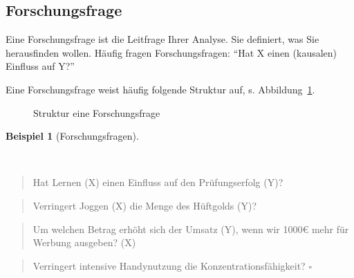 \documentclass[
  letterpaper,
  oneside,
  open=any]{scrbook}
\theoremstyle{definition}
\theoremstyle{definition}
\newtheorem{example}{Beispiel}[chapter]
\theoremstyle{definition}
\theoremstyle{remark}
\begin{document}
\subsection{Forschungsfrage}\label{forschungsfrage}

Eine Forschungsfrage ist die Leitfrage Ihrer Analyse. Sie definiert, was
Sie herausfinden wollen. Häufig fragen Forschungsfragen: \enquote{Hat X
einen (kausalen) Einfluss auf Y?}

Eine Forschungsfrage weist häufig folgende Struktur auf, s.
Abbildung~\ref{fig-fo-struktur}.

\begin{figure}


\caption{\label{fig-fo-struktur}Struktur eine Forschungsfrage}

\end{figure}%

\begin{example}[Forschungsfragen]\protect\hypertarget{exm-fofrage1}{}\label{exm-fofrage1}

~

\begin{quote}
Hat Lernen (X) einen Einfluss auf den Prüfungserfolg (Y)?
\end{quote}

\begin{quote}
Verringert Joggen (X) die Menge des Hüftgolds (Y)?
\end{quote}

\begin{quote}
Um welchen Betrag erhöht sich der Umsatz (Y), wenn wir 1000€ mehr für
Werbung ausgeben? (X)
\end{quote}

\begin{quote}
Verringert intensive Handynutzung die Konzentrationsfähigkeit?
\(\square\)
\end{quote}

\end{example}
\end{document}
